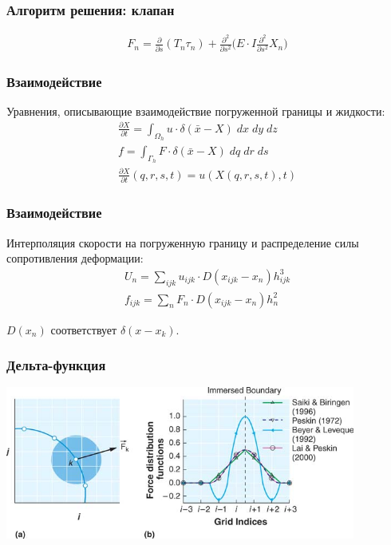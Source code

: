 \documentclass[14pt]{beamer}
\begin{document}
\begin{frame}
\frametitle{Алгоритм решения: клапан}
\begin{gather}
    \label{eq:strain_energy}
    F_{n} =  \frac{\partial}{\partial s}(T_{n} \tau_{n}) + \frac{\partial^2}{\partial s^2} \Big( E \cdot I \frac{\partial^2}{\partial s^2} X_{n} \Big)
\end{gather}
\end{frame}


\begin{frame}
\frametitle{Взаимодействие}
Уравнения, описывающие взаимодействие погруженной границы и жидкости:
\begin{gather}
    \label{eq:ibm_velocity}
    \frac{\partial X}{\partial t} = \int_{\Omega_h} u \cdot \delta (\bar{x} - X)\; dx\; dy\; dz \\
    \label{eq:ibm_force}
    f = \int_{\Gamma_h} F \cdot \delta (\bar{x} - X)\; dq\; dr\; ds\\
    \label{eq:no_slip}
    \frac{\partial X}{\partial t} (q, r, s, t) = u(X(q, r, s, t), t)
\end{gather}
\end{frame}

\begin{frame}
\frametitle{Взаимодействие}
Интерполяция скорости на погруженную границу и распределение силы сопротивления деформации:
\begin{gather}
    \label{eq:interpolation}
    U_n = \sum_{ijk}u_{ijk} \cdot D(x_{ijk} - x_n) h_{ijk}^3 \\
    \label{eq:spreading}
    f_{ijk} = \sum_n F_n \cdot D(x_{ijk} - x_n) h^2_n
\end{gather}

$D(x_n)$ соответствует $\delta(x - x_k)$.
\end{frame}

\begin{frame}
\frametitle{Дельта-функция}
    \begin{center}
        \includegraphics[width=11.5cm]{delta_function.png}
    \end{center}
\end{frame}
\end{document}
